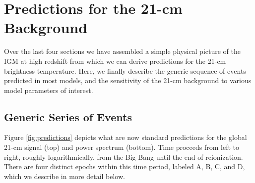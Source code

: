 \section{Predictions for the 21-cm Background} \label{sec:predictions}
Over the last four sections we have assembled a simple physical picture of the IGM at high redshift from which we can derive predictions for the 21-cm brightness temperature. Here, we finally describe the generic sequence of events predicted in most models, and the sensitivity of the 21-cm background to various model parameters of interest. 

\subsection{Generic Series of Events}
Figure \ref{fig:predictions} depicts what are now standard predictions for the global 21-cm signal (top) and power spectrum (bottom). Time proceeds from left to right, roughly logarithmically, from the Big Bang until the end of reionization. There are four distinct epochs within this time period, labeled A, B, C, and D, which we describe in more detail below.
